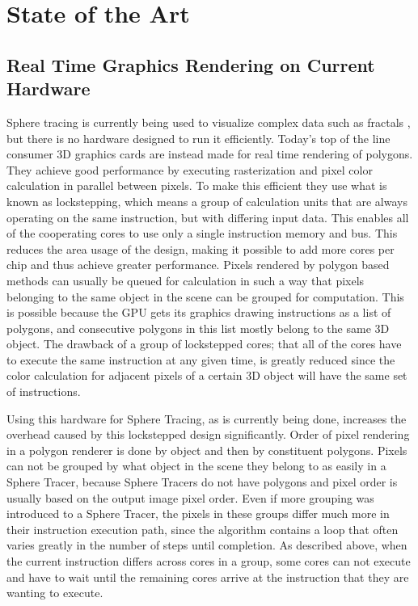 \chapter{State of the Art}

	\section{ Real Time Graphics Rendering on Current Hardware } 

		Sphere tracing is currently being used to visualize complex data such
		as fractals \cite{JONATHANGRANSKOG2017}, but there is no hardware
		designed to run	it efficiently. Today's top of the line consumer 3D
		graphics cards are instead made for real time rendering of
		polygons\cite{Houston2010}. They achieve good performance by
		executing rasterization and pixel color calculation in parallel
		between pixels. To make this efficient they use what is known as
		lockstepping, which means a group of calculation units that are
		always operating on the same instruction, but with differing input
		data. This enables all of the cooperating cores to use only a single
		instruction memory and bus. This reduces the area usage of the
		design, making it possible to add more cores per chip and thus
		achieve greater performance. Pixels rendered by polygon based methods
		can usually be queued for calculation in such a way that pixels
		belonging to the same object in the scene can be grouped for
		computation. This is possible because the GPU gets its graphics
		drawing instructions as a list of polygons, and consecutive polygons
		in this list mostly belong to the same 3D object. The drawback of a
		group of lockstepped cores; that all of the cores have to execute the
		same instruction at any given time, is greatly reduced since the
		color calculation for adjacent pixels of a certain 3D object will
		have the same set of instructions.
		
		Using this hardware for Sphere Tracing, as is currently being done,
		increases the overhead caused by this lockstepped design significantly.
		Order of pixel rendering in a polygon renderer is done by object and
		then by constituent polygons. Pixels can not be grouped by what object
		in the scene they belong to as easily in a Sphere Tracer, because Sphere
		Tracers do not have polygons and pixel order is usually based on the
		output image pixel order. Even if more grouping was introduced to a
		Sphere Tracer, the pixels in these groups differ much more in their
		instruction execution path, since the algorithm contains a loop that
		often varies greatly in the number of steps until completion. As
		described above, when the current instruction differs across cores in a
		group, some cores can not execute and have to wait until the remaining
		cores arrive at the instruction that they are wanting to execute.
		
